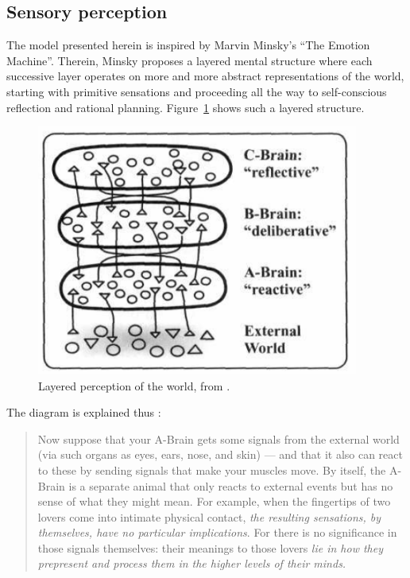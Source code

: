 \documentclass[]{scrartcl}
\theoremstyle{break}
\begin{document}
\subsection{Sensory perception}\label{sec:sensoryPerception}

The model presented herein is inspired by Marvin Minsky's ``The Emotion Machine''. Therein, Minsky proposes a layered mental structure where each successive layer operates on more and more abstract representations of the world, starting with primitive sensations and proceeding all the way to self-conscious reflection and rational planning. Figure~\ref{fig:brainLayers} shows such a layered structure.

 \begin{figure}[!h]
 	\centering
 	\includegraphics[width=300pt]{figs/emotionMachine_brainLayers.png}
 	\caption{Layered perception of the world, from \cite[p. 100]{emotionMachine}.}
 	\label{fig:brainLayers}
 \end{figure}
 
 \newpage
 
The diagram is explained thus \cite[p. 100]{emotionMachine}:

\begin{quote}
	Now suppose that your A-Brain gets some signals from the external world (via such organs as eyes, ears, nose, and skin) --- and that it also can react to these by sending signals that make your muscles move. By itself, the A-Brain is a separate animal that only reacts to external events but has no sense of what they might mean. For example, when the fingertips of two lovers come into intimate physical contact, {\em the resulting sensations, by themselves, have no particular implications}. For there is no significance in those signals themselves: their meanings to those lovers {\em lie in how they prepresent and process them in the higher levels of their minds.}
\end{quote}
\end{document}
